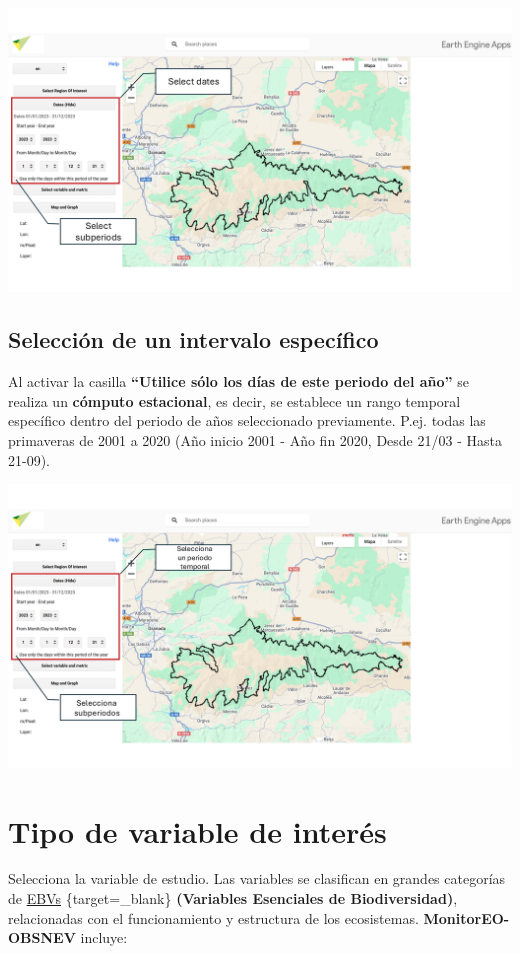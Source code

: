 \documentclass[
]{book}
\begin{document}
\includegraphics{assets/dates.png}

\section{\texorpdfstring{\textbf{Selección de un intervalo específico}}{Selección de un intervalo específico}}\label{selecciuxf3n-de-un-intervalo-especuxedfico}

Al activar la casilla \textbf{``Utilice sólo los días de este periodo del año''} se realiza un \textbf{cómputo estacional}, es decir, se establece un rango temporal específico dentro del periodo de años seleccionado previamente. P.ej. todas las primaveras de 2001 a 2020 (Año inicio 2001 - Año fin 2020, Desde 21/03 - Hasta 21-09).

\includegraphics{assets/dates_es.png}

\chapter{Tipo de variable de interés}\label{tipo-variable}

Selecciona la variable de estudio. Las variables se clasifican en grandes categorías de \href{https://geobon.org/ebvs/what-are-ebvs/}{EBVs} \{target=\_blank\} \textbf{(Variables Esenciales de Biodiversidad)}, relacionadas con el funcionamiento y estructura de los ecosistemas. \textbf{MonitorEO-OBSNEV} incluye:
\end{document}
